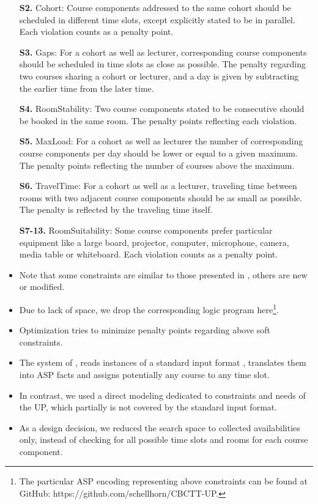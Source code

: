 \documentclass{easychair}
\newcommand{\UP}{UP}
\newcommand{\ASP}{ASP}
\begin{document}
\begin{itemize}
  \textbf{S2.} Cohort: Course components addressed to the same cohort should be scheduled in different time slots, except explicitly stated to be in parallel. Each violation counts as a penalty point. 

  \textbf{S3.} Gaps: For a cohort as well as lecturer, corresponding course components should be scheduled in time slots as close as possible. The penalty regarding two courses sharing a cohort or lecturer, and a day is given by subtracting the earlier time from the later time. 

  \textbf{S4.} RoomStability: Two course components stated to be consecutive should be booked in the same room. The penalty points reflecting each violation. 

  \textbf{S5.} MaxLoad: For a cohort as well as lecturer the number of corresponding course components per day should be lower or equal to a given maximum. The penalty points reflecting the number of courses above the maximum. 

  \textbf{S6.} TravelTime: For a cohort as well as a lecturer, traveling time between rooms with two adjacent course components should be as small as possible. The penalty is reflected by the traveling time itself. 

  \textbf{S7-13.} RoomSuitability: Some course components prefer particular equipment like a large board, projector, computer, microphone, camera, media table or whiteboard. Each violation counts as a penalty point. 

  \item%
  Note that some constraints are similar to those presented in \cite{bainkaokscsotawa18a}, others are new or modified.
  \item%
  Due to lack of space, we drop the corresponding logic program here\footnote{The particular \ASP{} encoding representing above constraints can be found at GitHub: https://github.com/schellhorn/CBCTT-UP.}.  
  \item%
  Optimization tries to minimize penalty points regarding above soft constraints. 
  \item%
  The system of \cite{bainkaokscsotawa18a}, reads instances of a standard input format \cite{bocegasc12a}, translates them into \ASP{} facts and assigns potentially any course to any time slot. 
  \item%
  In contrast, we used a direct modeling dedicated to constraints and needs of the \UP{}, which partially is not covered by the standard input format. 
  \item%
  As a design decision, we reduced the search space to collected availabilities only, instead of checking for all possible time slots and rooms for each course component.
\end{itemize}%
\end{document}
